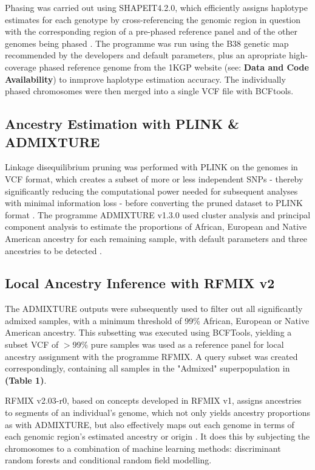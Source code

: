 \documentclass[11pt]{article}
\begin{document}
Phasing was carried out using SHAPEIT4.2.0, which efficiently assigns haplotype estimates for each genotype by cross-referencing the genomic region in question with the corresponding region of a pre-phased reference panel and of the other genomes being phased \parencite{Delaneau2019}. The programme was run using the B38 genetic map recommended by the developers and default parameters, plus an apropriate high-coverage phased reference genome from the 1KGP website (see: \textbf{Data and Code Availability}) to inmprove haplotype estimation accuracy. The individually phased chromosomes were then merged into a single VCF file with BCFtools. 





\subsection{Ancestry Estimation with PLINK \& ADMIXTURE}


Linkage disequilibrium pruning was performed with PLINK on the genomes in VCF format, which creates a subset of more or less independent SNPs - thereby significantly reducing the computational power needed for subsequent analyses with minimal information loss - before converting the pruned dataset to PLINK format \parencite{Purcell2007}.
The programme ADMIXTURE v1.3.0 used cluster analysis and principal component analysis to estimate the proportions of African, European and Native American ancestry for each remaining sample, with default parameters and three ancestries to be detected \parencite{Alexander2009}.





\subsection{Local Ancestry Inference with RFMIX v2}


The ADMIXTURE outputs were subsequently used to filter out all significantly admixed samples, with a minimum threshold of 99\% African, European or Native American ancestry. This subsetting was executed using BCFTools, yielding a subset VCF of $>$99\% pure samples was used as a reference panel for local ancestry assignment with the programme RFMIX. A query subset was created correspondingly, containing all samples in the "Admixed" superpopulation in \textbf{(Table 1)}.

RFMIX v2.03-r0, based on concepts developed in RFMIX v1, assigns ancestries to segments of an individual's genome, which not only yields ancestry proportions as with ADMIXTURE, but also effectively maps out each genome in terms of each genomic region's estimated ancestry or origin \parencite{Maples2013}. It does this by subjecting the chromosomes to a combination of machine learning methods: discriminant random forests and conditional random field modelling.
\end{document}
